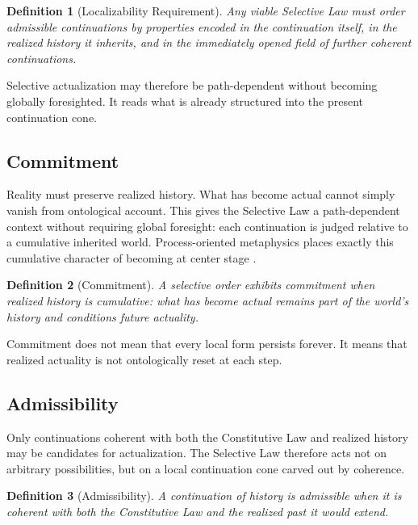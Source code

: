 \documentclass[11pt]{article}
\theoremstyle{foundation}
\newtheorem{definition}{Definition}
\begin{document}
\begin{definition}[Localizability Requirement]
Any viable Selective Law must order admissible continuations by properties encoded in the continuation itself, in the realized history it inherits, and in the immediately opened field of further coherent continuations.
\end{definition}

Selective actualization may therefore be path-dependent without becoming globally foresighted. It reads what is already structured into the present continuation cone.

\subsection{Commitment}

Reality must preserve realized history. What has become actual cannot simply vanish from ontological account. This gives the Selective Law a path-dependent context without requiring global foresight: each continuation is judged relative to a cumulative inherited world. Process-oriented metaphysics places exactly this cumulative character of becoming at center stage \citep{Whitehead1929,Rescher1996}.

\begin{definition}[Commitment]
A selective order exhibits commitment when realized history is cumulative: what has become actual remains part of the world's history and conditions future actuality.
\end{definition}

Commitment does not mean that every local form persists forever. It means that realized actuality is not ontologically reset at each step.

\subsection{Admissibility}

Only continuations coherent with both the Constitutive Law and realized history may be candidates for actualization. The Selective Law therefore acts not on arbitrary possibilities, but on a local continuation cone carved out by coherence.

\begin{definition}[Admissibility]
A continuation of history is admissible when it is coherent with both the Constitutive Law and the realized past it would extend.
\end{definition}
\end{document}
